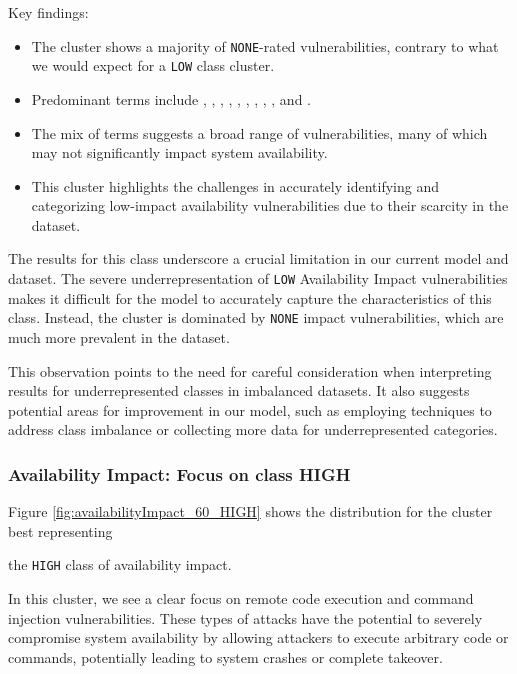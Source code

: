 \documentclass[12pt]{article}
\begin{document}
Key findings:

\begin{itemize}

	\item The cluster shows a majority of \texttt{NONE}-rated vulnerabilities, contrary to what we
	      would expect for a \texttt{LOW} class cluster.

	\item Predominant terms include , , , , , ,
	      , , , and .

	\item The mix of terms suggests a broad range of vulnerabilities, many of which may not
	      significantly impact system availability.

	\item This cluster highlights the challenges in accurately identifying and categorizing
	      low-impact availability vulnerabilities due to their scarcity in the dataset.

\end{itemize}

The results for this class underscore a crucial limitation in our current model and dataset. The
severe underrepresentation of \texttt{LOW} Availability Impact vulnerabilities makes it difficult
for the model to accurately capture the characteristics of this class. Instead, the cluster is
dominated by \texttt{NONE} impact vulnerabilities, which are much more prevalent in the dataset.

This observation points to the need for careful consideration when interpreting results for
underrepresented classes in imbalanced datasets. It also suggests potential areas for improvement in
our model, such as employing techniques to address class imbalance or collecting more data for
underrepresented categories.

\subsubsection{Availability Impact: Focus on class HIGH}

Figure \ref{fig:availabilityImpact_60_HIGH} shows the distribution for the cluster best representing

the \texttt{HIGH} class of availability impact.

In this cluster, we see a clear focus on remote code execution and command injection
vulnerabilities. These types of attacks have the potential to severely compromise system
availability by allowing attackers to execute arbitrary code or commands, potentially leading to
system crashes or complete takeover.
\end{document}
